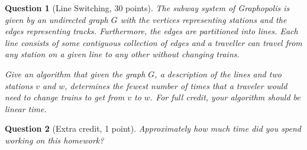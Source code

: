\documentclass{article}
\newtheorem{ques}{Question}
\begin{document}
\begin{ques}[Line Switching, 30 points]
The subway system of Graphopolis is given by an undirected graph $G$ with the vertices representing stations and the edges representing tracks. Furthermore, the edges are partitioned into lines. Each line consists of some contiguous collection of edges and a traveller can travel from any station on a given line to any other without changing trains.

Give an algorithm that given the graph $G$, a description of the lines and two stations $v$ and $w$, determines the fewest number of times that a traveler would need to change trains to get from $v$ to $w$. For full credit, your algorithm should be linear time.
\end{ques}

\begin{ques}[Extra credit, 1 point]
Approximately how much time did you spend working on this homework?
\end{ques}
\end{document}
